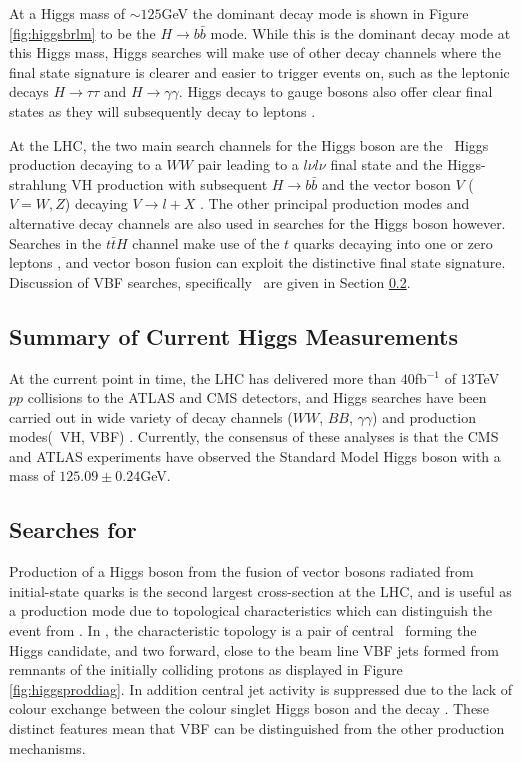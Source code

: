 		At a Higgs mass of $\sim125$GeV the dominant decay mode is shown in Figure \ref{fig:higgsbrlm} to be the $H\rightarrow b\bar{b}$ mode. While this is the dominant decay mode at this Higgs mass, Higgs searches will make use of other decay channels where the final state signature is clearer and easier to trigger events on, such as the leptonic decays $H\rightarrow\tau\tau$ and $H\rightarrow\gamma\gamma$. Higgs decays to gauge bosons also offer clear final states as they will subsequently decay to leptons \cite{higgssearch}.

		At the LHC, the two main search channels for the Higgs boson are the \ggF\ Higgs production decaying to a $WW$ pair leading to a $l\nu l\nu$ final state \cite{hprod, searchggf} and the Higgs-strahlung VH production with subsequent $H\rightarrow b\bar{b}$ and the vector boson $V$ ($V = W, Z$) decaying $V\rightarrow l+X$ \cite{hprod, searchvh}. The other principal production modes and alternative decay channels are also used in searches for the Higgs boson however. Searches in the $t\bar{t}H$ channel make use of the $t$ quarks decaying into one or zero leptons \cite{tth}, and vector boson fusion can exploit the distinctive final state signature. Discussion of VBF searches, specifically \VBFHBB\ are given in Section \ref{t:VBF}.

	\subsection{Summary of Current Higgs Measurements}

		At the current point in time, the LHC has delivered more than $40$fb$^{-1}$ of $13$TeV $pp$ collisions to the ATLAS and CMS detectors, and Higgs searches have been carried out in wide variety of decay channels ($WW$, $BB$, $\gamma\gamma$) and production modes(\ggF\ VH, VBF) \cite{pdghiggs, VBFHbb8tev, searchggf, searchvh, tth}. Currently, the consensus of these analyses is that the CMS and ATLAS experiments have observed the Standard Model Higgs boson with a mass of $125.09\pm0.24$GeV\cite{pdg}.

	\subsection{Searches for \VBFHBB}
		\label{t:VBF}

		Production of a Higgs boson from the fusion of vector bosons radiated from initial-state quarks is the second largest cross-section at the LHC, and is useful as a production mode due to topological characteristics which can distinguish the event from \ggF. In \VBFHBB, the characteristic topology is a pair of central \bjets\ forming the Higgs candidate, and two forward, close to the beam line VBF jets formed from remnants of the initially colliding protons as displayed in Figure \ref{fig:higgsproddiag}. In addition central jet activity is suppressed due to the lack of colour exchange between the colour singlet Higgs boson and the decay \bquarks\cite{VBF2004}.  These distinct features mean that VBF can be distinguished from the other production mechanisms.

